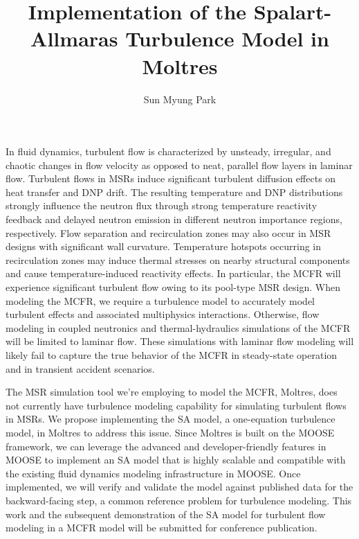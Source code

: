 \documentclass[letterpaper,11pt]{article}
\begin{document}
%
\title{Implementation of the Spalart-Allmaras Turbulence Model in Moltres}
\author{Sun Myung Park}
\date{}
%
\maketitle
%
In fluid dynamics, turbulent flow is characterized by unsteady, irregular, and chaotic changes in
flow velocity as opposed to neat, parallel flow layers in laminar flow. Turbulent flows in
\glspl{MSR} induce significant turbulent diffusion effects on heat transfer and \gls{DNP} drift.
The resulting temperature and \gls{DNP} distributions strongly influence the neutron flux through
strong temperature reactivity feedback and delayed neutron emission in different neutron importance
regions, respectively. Flow separation and recirculation zones may also occur in \gls{MSR} designs
with significant wall curvature. Temperature hotspots occurring in recirculation zones may induce
thermal stresses on nearby structural components and cause temperature-induced reactivity effects.
In particular, the \gls{MCFR} will experience significant turbulent flow owing to its
pool-type \gls{MSR} design. When modeling the \gls{MCFR}, we require a turbulence model to
accurately model turbulent effects and associated multiphysics interactions. Otherwise, flow
modeling in coupled neutronics and thermal-hydraulics simulations of the \gls{MCFR} will be limited
to laminar flow. These simulations with laminar flow modeling will likely fail to capture the true
behavior of the \gls{MCFR} in steady-state operation and in transient accident scenarios.

The \gls{MSR} simulation tool we're employing to model the \gls{MCFR}, Moltres, does not
currently have turbulence modeling capability for simulating turbulent flows in
\glspl{MSR}. We propose implementing the \gls{SA} model, a one-equation turbulence model,
in Moltres to address this issue. Since Moltres is built on the \gls{MOOSE} framework, we can
leverage the advanced and developer-friendly features in \gls{MOOSE} to implement an \gls{SA} model
that is highly scalable and compatible with the existing fluid dynamics modeling infrastructure in
\gls{MOOSE}. Once implemented, we will verify and validate the model against published data for the
backward-facing step, a common reference problem for turbulence modeling. This work and the
subsequent demonstration of the \gls{SA} model for turbulent flow modeling in a \gls{MCFR} model
will be submitted for conference publication.
\end{document}
